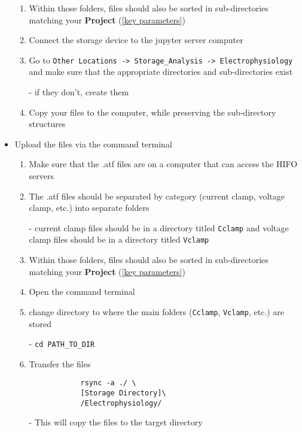 \documentclass{article}
\begin{document}
\begin{itemize}
\begin{enumerate}
        \item Within those folders, files should also be sorted in sub-directories matching your \textbf{Project} (\ref{key parameters})
        
        \item Connect the storage device to the jupyter server computer
        
        \item Go to \verb|Other Locations -> Storage_Analysis -> Electrophysiology| and make sure that the appropriate directories and sub-directories exist
        
        - if they don't, create them
        
        \item Copy your files to the computer, while preserving the sub-directory structures
    \end{enumerate}
    
    \item Upload the files via the command terminal
    
    \begin{enumerate}
        \item Make sure that the .atf files are on a computer that can access the HIFO servers
        
        \item The .atf files should be separated by category (current clamp, voltage clamp, etc.) into separate folders
        
        - current clamp files should be in a directory titled \verb|Cclamp| and voltage clamp files should be in a directory titled \verb|Vclamp|
        
        \item Within those folders, files should also be sorted in sub-directories matching your \textbf{Project} (\ref{key parameters})
        
        \item Open the command terminal
        
        \item change directory to where the main folders (\verb|Cclamp|, \verb|Vclamp|, etc.) are stored
        
        - \verb|cd PATH_TO_DIR|
        
        \item Transfer the files
        
        \begin{verbatim}
            rsync -a ./ \
            [Storage Directory]\
            /Electrophysiology/
        \end{verbatim}
        
        - This will copy the files to the target directory
    \end{enumerate}
    
\end{itemize}
\end{document}
